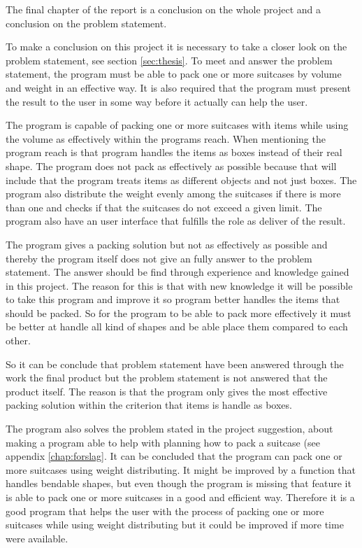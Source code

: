 The final chapter of the report is a conclusion on the whole project and a conclusion on the problem statement.

To make a conclusion on this project it is necessary to take a closer look on the problem statement, see section \ref{sec:thesis}. To meet and answer the problem statement, the program must be able to pack one or more suitcases by volume and weight in an effective way. It is also required that the program must present the result to the user in some way before it actually can help the user.

The program is capable of packing one or more suitcases with items while using the volume as effectively within the programs reach. When mentioning the program reach is that program handles the items as boxes instead of their real shape.
The program does not pack as effectively as possible because that will include that the program treats items as different objects and not just boxes. The program also distribute the weight evenly among the suitcases if there is more than one and checks if that the suitcases do not exceed a given limit. The program also have an user interface that fulfills the role as deliver of the result.

The program gives a packing solution but not as effectively as possible and thereby the program itself does not give an fully answer to the problem statement. The answer should be find through experience and knowledge gained in this project. The reason for this is that with new knowledge it will be possible to take this program and improve it so program better handles the items that should be packed. So for the program to be able to pack more effectively it must be better at handle all kind of shapes and be able place them compared to each other.

So it can be conclude that problem statement have been answered through the work the final product but the problem statement is not answered that the product itself. The reason is that the program only gives the most effective packing solution within the criterion that items is handle as boxes.

The program also solves the problem stated in the project suggestion, about making a program able to help with planning how to pack a suitcase (see appendix \ref{chap:forslag}. It can be concluded that the program can pack one or more suitcases using weight distributing. It might be improved by a function that handles bendable shapes, but even though the program is missing that feature it is able to pack one or more suitcases in a good and efficient way. Therefore it is a good program that helps the user with the process of packing one or more suitcases while using weight distributing but it could be improved if more time were available.

